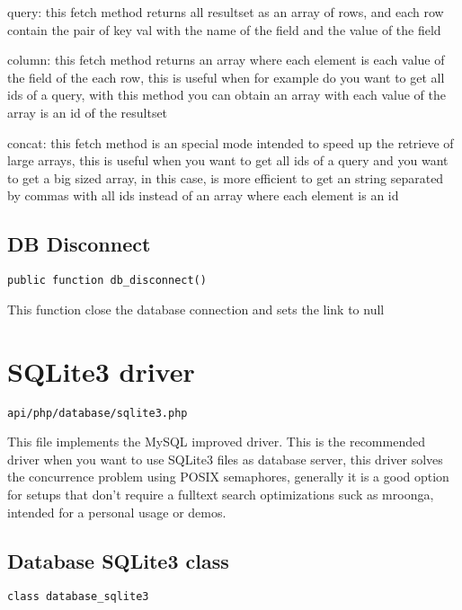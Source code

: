 \documentclass[a4paper]{book}
\begin{document}
query: this fetch method returns all resultset as an array of rows, and each row contain the
pair of key val with the name of the field and the value of the field

column: this fetch method returns an array where each element is each value of the field of
the each row, this is useful when for example do you want to get all ids of a query, with
this method you can obtain an array with each value of the array is an id of the resultset

concat: this fetch method is an special mode intended to speed up the retrieve of large
arrays, this is useful when you want to get all ids of a query and you want to get a big
sized array, in this case, is more efficient to get an string separated by commas with all
ids instead of an array where each element is an id

\hypertarget{toc359}{}
\subsection{DB Disconnect}

\begin{lstlisting}
public function db_disconnect()
\end{lstlisting}

This function close the database connection and sets the link to null

\hypertarget{toc360}{}
\section{SQLite3 driver}

\begin{lstlisting}
api/php/database/sqlite3.php
\end{lstlisting}

This file implements the MySQL improved driver. This is the recommended driver when you want
to use SQLite3 files as database server, this driver solves the concurrence problem using
POSIX semaphores, generally it is a good option for setups that don't require a fulltext
search optimizations suck as mroonga, intended for a personal usage or demos.

\hypertarget{toc361}{}
\subsection{Database SQLite3 class}

\begin{lstlisting}
class database_sqlite3
\end{lstlisting}
\end{document}
